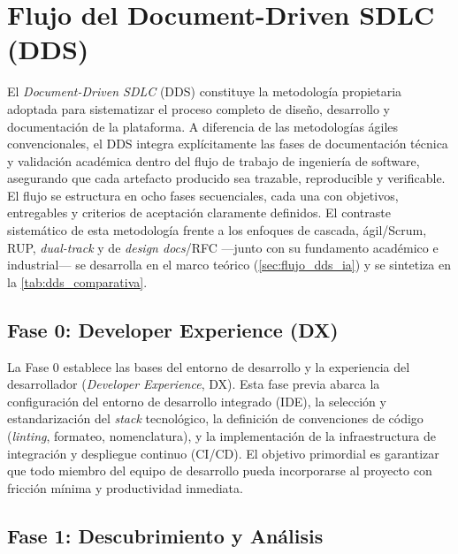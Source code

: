 
\section{Flujo del Document-Driven SDLC (DDS)}
\label{sec:flujo-dds}

El \textit{Document-Driven SDLC} (DDS) constituye la metodolog\'ia
propietaria adoptada para sistematizar el proceso completo de dise\~no,
desarrollo y documentaci\'on de la plataforma. A diferencia de las
metodolog\'ias \'agiles convencionales, el DDS integra expl\'icitamente las
fases de documentaci\'on t\'ecnica y validaci\'on acad\'emica dentro del flujo
de trabajo de ingenier\'ia de software, asegurando que cada artefacto producido
sea trazable, reproducible y verificable. El flujo se estructura en ocho fases
secuenciales, cada una con objetivos, entregables y criterios de aceptaci\'on
claramente definidos. El contraste sistem\'atico de esta metodolog\'ia frente a
los enfoques de cascada, \'agil/Scrum, RUP, \textit{dual-track} y de
\textit{design docs}/RFC ---junto con su fundamento acad\'emico e industrial---
se desarrolla en el marco te\'orico (\autoref{sec:flujo_dds_ia}) y se sintetiza en
la \autoref{tab:dds_comparativa}.

\subsection{Fase 0: Developer Experience (DX)}
\label{subsec:fase0-dx}

La Fase 0 establece las bases del entorno de desarrollo y la experiencia del
desarrollador (\textit{Developer Experience}, DX). Esta fase previa abarca la
configuraci\'on del entorno de desarrollo integrado (IDE), la selecci\'on y
estandarizaci\'on del \textit{stack} tecnol\'ogico, la definici\'on de
convenciones de c\'odigo (\textit{linting}, formateo, nomenclatura), y la
implementaci\'on de la infraestructura de integraci\'on y despliegue continuo
(CI/CD). El objetivo primordial es garantizar que todo miembro del equipo de
desarrollo pueda incorporarse al proyecto con fricci\'on m\'inima y productividad
inmediata.

\subsection{Fase 1: Descubrimiento y An\'alisis}
\label{subsec:fase1-descubrimiento}


